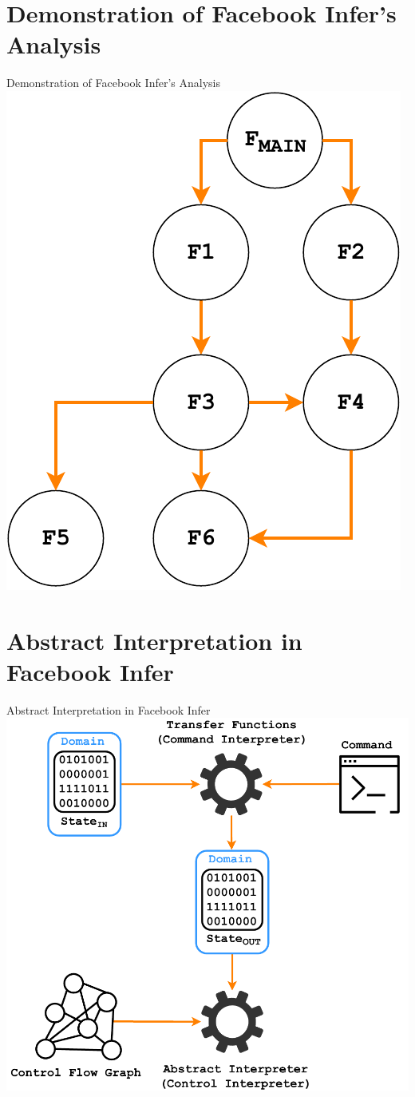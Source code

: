 \documentclass[10pt, xcolor=pdflatex, hyperref={unicode}, aspectratio=169]{beamer}
\begin{document}


\section{Demonstration of Facebook Infer's Analysis}
\begin{frame}{Demonstration of Facebook Infer's Analysis}
    \centering
    \includegraphics[width=.4 \linewidth]{infer-call-graph.pdf}
\end{frame}





\section{Abstract Interpretation in Facebook Infer}
\begin{frame}{Abstract Interpretation in Facebook Infer}
    \centering
    \includegraphics[width=.58 \linewidth]{infer-analysis.pdf}
\end{frame}


\end{document}
